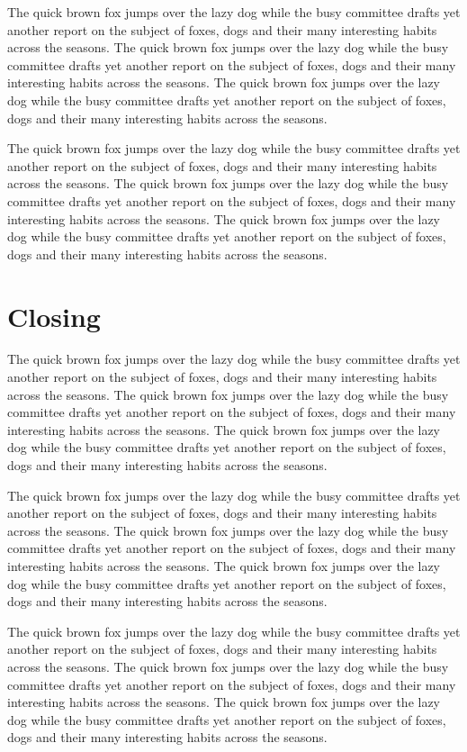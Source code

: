 \documentclass{article}
\begin{document}
The quick brown fox jumps over the lazy dog while the busy committee drafts yet another report on the subject of foxes, dogs and their many interesting habits across the seasons. The quick brown fox jumps over the lazy dog while the busy committee drafts yet another report on the subject of foxes, dogs and their many interesting habits across the seasons. The quick brown fox jumps over the lazy dog while the busy committee drafts yet another report on the subject of foxes, dogs and their many interesting habits across the seasons. 

The quick brown fox jumps over the lazy dog while the busy committee drafts yet another report on the subject of foxes, dogs and their many interesting habits across the seasons. The quick brown fox jumps over the lazy dog while the busy committee drafts yet another report on the subject of foxes, dogs and their many interesting habits across the seasons. The quick brown fox jumps over the lazy dog while the busy committee drafts yet another report on the subject of foxes, dogs and their many interesting habits across the seasons. 

\section{Closing}\label{sec5}
The quick brown fox jumps over the lazy dog while the busy committee drafts yet another report on the subject of foxes, dogs and their many interesting habits across the seasons. The quick brown fox jumps over the lazy dog while the busy committee drafts yet another report on the subject of foxes, dogs and their many interesting habits across the seasons. The quick brown fox jumps over the lazy dog while the busy committee drafts yet another report on the subject of foxes, dogs and their many interesting habits across the seasons. 

The quick brown fox jumps over the lazy dog while the busy committee drafts yet another report on the subject of foxes, dogs and their many interesting habits across the seasons. The quick brown fox jumps over the lazy dog while the busy committee drafts yet another report on the subject of foxes, dogs and their many interesting habits across the seasons. The quick brown fox jumps over the lazy dog while the busy committee drafts yet another report on the subject of foxes, dogs and their many interesting habits across the seasons. 

The quick brown fox jumps over the lazy dog while the busy committee drafts yet another report on the subject of foxes, dogs and their many interesting habits across the seasons. The quick brown fox jumps over the lazy dog while the busy committee drafts yet another report on the subject of foxes, dogs and their many interesting habits across the seasons. The quick brown fox jumps over the lazy dog while the busy committee drafts yet another report on the subject of foxes, dogs and their many interesting habits across the seasons. 
\end{document}
